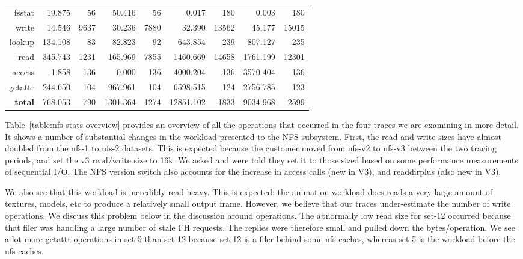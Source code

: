 \begin{table*}
\begin{tabular}{|r||r|r||r|r||r|r||r|r|}
      fsstat &    19.875 &    56 &    50.416 &    56 &     0.017 &   180 &     0.003 &   180 \\
       write &    14.546 &  9637 &    30.236 &  7880 &    32.390 & 13562 &    45.177 & 15015 \\
      lookup &   134.108 &    83 &    82.823 &    92 &   643.854 &   239 &   807.127 &   235 \\
\hline
        read &   345.743 &  1231 &   165.969 &  7855 &  1460.669 & 14658 &  1761.199 & 12301 \\
      access &     1.858 &   136 &     0.000 &   136 &  4000.204 &   136 &  3570.404 &   136 \\
     getattr &   244.650 &   104 &   967.961 &   104 &  6598.515 &   124 &  2756.785 &   123 \\
\hline
 {\bf total} &   768.053 &   790 &  1301.364 &  1274 & 12851.102 &  1833 &  9034.968 &  2599 \\
\hline
\end{tabular}
\caption{...}
\label{table:nfs-stats-overview}
\end{table*}

Table~\ref{table:nfs-stats-overview} provides an overview of all the
operations that occurred in the four traces we are examining in more
detail.  It shows a number of substantial changes in the workload
presented to the NFS subsystem.  First, the read and write sizes have
almost doubled from the nfs-1 to nfs-2 datasets.  This is expected
because the customer moved from nfs-v2 to nfs-v3 between the two
tracing periods, and set the v3 read/write size to 16k.  We asked and
were told they set it to those sized based on some performance
measurements of sequential I/O.  The NFS version switch also accounts
for the increase in access calls (new in V3), and readdirplus (also
new in V3).  

We also see that this workload is incredibly read-heavy.  This is
expected; the animation workload does reads a very large amount of
textures, models, etc to produce a relatively small output frame.
However, we believe that our traces under-estimate the number of write
operations.  We discuss this problem below in the discussion around
operations.  The abnormally low read size for set-12 occurred because
that filer was handling a large number of stale FH requests.  The
replies were therefore small and pulled down the bytes/operation.  We
see a lot more getattr operations in set-5 than set-12 because set-12
is a filer behind some nfs-caches, whereas set-5 is the workload
before the nfs-caches.

